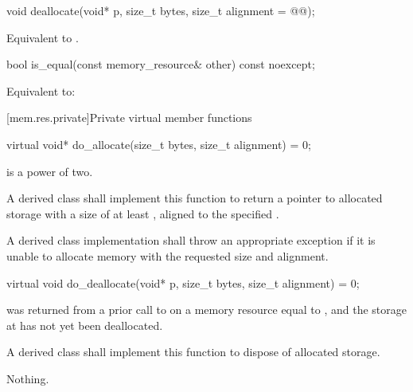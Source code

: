 %
\begin{itemdecl}
void deallocate(void* p, size_t bytes, size_t alignment = @@);
\end{itemdecl}

\begin{itemdescr}
\pnum
\effects
Equivalent to .
\end{itemdescr}

%
\begin{itemdecl}
bool is_equal(const memory_resource& other) const noexcept;
\end{itemdecl}

\begin{itemdescr}
\pnum
\effects
Equivalent to: 
\end{itemdescr}


[mem.res.private]{Private virtual member functions}

%
\begin{itemdecl}
virtual void* do_allocate(size_t bytes, size_t alignment) = 0;
\end{itemdecl}

\begin{itemdescr}
\pnum
\expects
{} is a power of two.

\pnum
\returns
A derived class shall implement this function to
return a pointer to allocated storage
with a size of at least ,
aligned to the specified .

\pnum
\throws
A derived class implementation shall throw an appropriate exception if it is unable to allocate memory with the requested size and alignment.
\end{itemdescr}

%
\begin{itemdecl}
virtual void do_deallocate(void* p, size_t bytes, size_t alignment) = 0;
\end{itemdecl}

\begin{itemdescr}
\pnum
\expects
{} was returned from a prior call to 
on a memory resource equal to ,
and the storage at  has not yet been deallocated.

\pnum
\effects
A derived class shall implement this function to dispose of allocated storage.

\pnum
\throws
Nothing.
\end{itemdescr}

